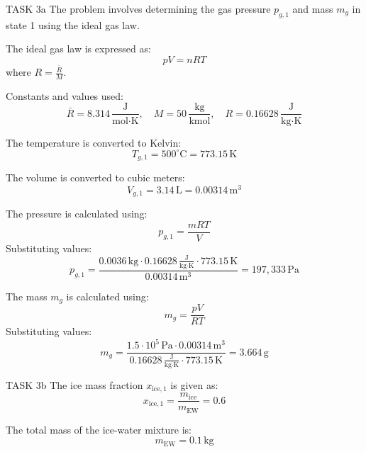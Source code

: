 TASK 3a  
The problem involves determining the gas pressure \( p_{g,1} \) and mass \( m_g \) in state 1 using the ideal gas law.  

The ideal gas law is expressed as:  
\[
pV = nRT
\]  
where \( R = \frac{\bar{R}}{M} \).  

Constants and values used:  
\[
\bar{R} = 8.314 \, \frac{\text{J}}{\text{mol·K}}, \quad M = 50 \, \frac{\text{kg}}{\text{kmol}}, \quad R = 0.16628 \, \frac{\text{J}}{\text{kg·K}}
\]  

The temperature is converted to Kelvin:  
\[
T_{g,1} = 500^\circ\text{C} = 773.15 \, \text{K}
\]  

The volume is converted to cubic meters:  
\[
V_{g,1} = 3.14 \, \text{L} = 0.00314 \, \text{m}^3
\]  

The pressure is calculated using:  
\[
p_{g,1} = \frac{mRT}{V}
\]  
Substituting values:  
\[
p_{g,1} = \frac{0.0036 \, \text{kg} \cdot 0.16628 \, \frac{\text{J}}{\text{kg·K}} \cdot 773.15 \, \text{K}}{0.00314 \, \text{m}^3} = 197,333 \, \text{Pa}
\]  

The mass \( m_g \) is calculated using:  
\[
m_g = \frac{pV}{RT}
\]  
Substituting values:  
\[
m_g = \frac{1.5 \cdot 10^5 \, \text{Pa} \cdot 0.00314 \, \text{m}^3}{0.16628 \, \frac{\text{J}}{\text{kg·K}} \cdot 773.15 \, \text{K}} = 3.664 \, \text{g}
\]  

TASK 3b  
The ice mass fraction \( x_{\text{ice},1} \) is given as:  
\[
x_{\text{ice},1} = \frac{m_{\text{ice}}}{m_{\text{EW}}} = 0.6
\]  

The total mass of the ice-water mixture is:  
\[
m_{\text{EW}} = 0.1 \, \text{kg}
\]